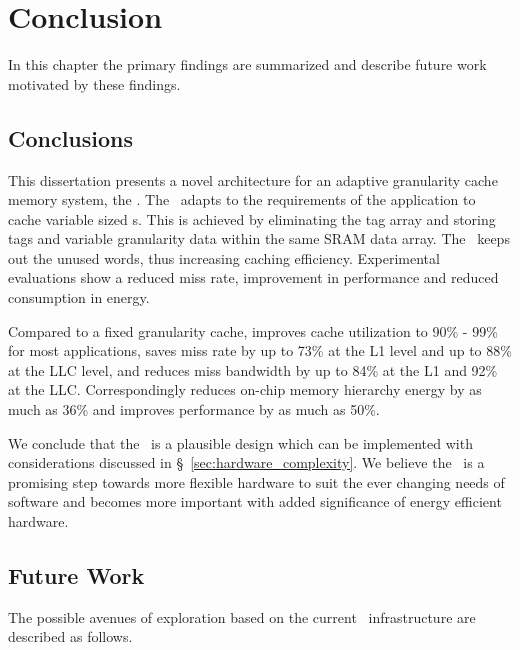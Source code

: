 
%
%

\chapter{Conclusion}
\label{chap:conclusions}

In this chapter the primary findings are summarized and describe future work motivated by these findings. 

\section{Conclusions}

This dissertation presents a novel architecture for an adaptive granularity cache memory system, the \AC{}. The \AC\ adapts to the requirements of the application to cache variable sized \AB{}s. This is achieved by eliminating the tag array and storing tags and variable granularity data within the same SRAM data array. The \AC\ keeps out the unused words, thus increasing caching efficiency. Experimental evaluations show a reduced miss rate, improvement in performance and reduced consumption in energy. 

Compared to a fixed granularity cache, improves cache utilization to 90\% - 99\% for most applications, saves miss rate by up to 73\% at the L1 level and up to 88\% at the LLC level, and reduces miss bandwidth by up to 84\% at the L1 and 92\% at the LLC. Correspondingly reduces on-chip memory hierarchy energy by as much as 36\% and improves performance by as much as 50\%.

We conclude that the \AC\ is a plausible design which can be implemented with considerations discussed in \S~\ref{sec:hardware_complexity}. We believe the \AC\ is a promising step towards more flexible hardware to suit the ever changing needs of software and becomes more important with added significance of energy efficient hardware.

\section{Future Work}
The possible avenues of exploration based on the current \AC\ infrastructure are described as follows.

